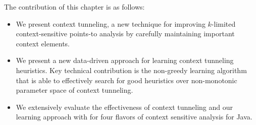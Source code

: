 The contribution of this chapter is as follows:
\begin{itemize}
\item We present context tunneling, a new technique for
  improving $k$-limited context-sensitive points-to analysis by carefully maintaining
  important context elements. %

  \item We present a new data-driven approach for learning context
    tunneling heuristics. Key technical contribution is the non-greedy
    learning algorithm that is able to effectively search for good
    heuristics over non-monotonic parameter space of context
    tunneling.

  \item We extensively evaluate the effectiveness of context tunneling and our
    learning approach with for four flavors of context sensitive
    analysis for Java. %
\end{itemize}







